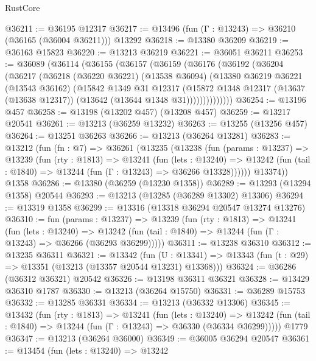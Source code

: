 \begin{lexlean}{RustCore}
\begin{coremodule}
@36211 := @36195 @12317
@36217 := @13496 (fun (Γ : @13243) => @36210 (@36165 (@36004 @36211))) @13292
@36218 := @13380 @36209
@36219 := @36163 @15823
@36220 := @13213 @36219
@36221 := @36051 @36211
@36253 := @36089
    (@36114
      (@36155
        (@36157
          (@36159
            (@36176
              (@36192
                (@36204
                  (@36217
                    (@36218
                      (@36220 @36221)
                      (@13538 @36094)
                      (@13380
                        @36219
                        @36221
                        (@13543 @36162)
                        (@15842
                          @1349
                          @31
                          @12317
                          (@15872
                            @1348
                            @12317
                            (@13637 (@13638 @12317))
                            (@13642 (@13644 @1348 @31))))))))))))))
@36254 := @13196 @457
@36258 := @13198 (@13202 @457) (@13208 @457)
@36259 := @13217 @20541
@36261 := @13213 (@36259 @13232)
@36263 := @13255 (@13256 @457)
@36264 := @13251 @36263
@36266 := @13213 (@36264 @13281)
@36283 := @13212
    (fun (fn : @7) =>
    @36261
      (@13235
        (@13238
          (fun (params : @13237) =>
          @13239
            (fun (rty : @1813) =>
            @13241
              (fun (lets : @13240) =>
              @13242 (fun (tail : @1840) => @13244 (fun (Γ : @13243) => @36266 @13328))))))
        @13374))
    @1358
@36286 := @13380 (@36259 (@13230 @1358))
@36289 := @13293 (@13294 @1358) @20544
@36293 := @13213 (@13285 (@36289 @13302) @13306)
@36294 := @13319 @1358
@36299 := @13316 (@13318 @36294 @20547 @13274 @13276)
@36310 := fun (params : @13237) =>
  @13239
    (fun (rty : @1813) =>
    @13241
      (fun (lets : @13240) =>
      @13242 (fun (tail : @1840) => @13244 (fun (Γ : @13243) => @36266 (@36293 @36299)))))
@36311 := @13238 @36310
@36312 := @13235 @36311
@36321 := @13342
    (fun (U : @13341) => @13343 (fun (t : @29) => @13351 (@13213 (@13357 @20544 @13231) @13368)))
@36324 := @36286 (@36312 @36321) @20542
@36326 := @13198 @36311 @36321
@36328 := @13429 @36310 @1787
@36330 := @13213 (@36264 @15750)
@36331 := @36289 @15753
@36332 := @13285 @36331
@36334 := @13213 (@36332 @13306)
@36345 := @13432
    (fun (rty : @1813) =>
    @13241
      (fun (lets : @13240) =>
      @13242 (fun (tail : @1840) => @13244 (fun (Γ : @13243) => @36330 (@36334 @36299)))))
    @1779
@36347 := @13213 (@36264 @36000)
@36349 := @36005 @36294 @20547
@36361 := @13454
    (fun (lets : @13240) =>
    @13242

\end{coremodule}
\end{lexlean}
